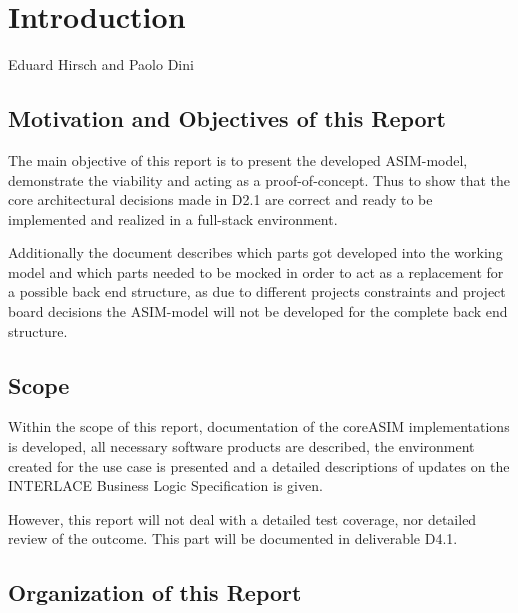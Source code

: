 \chapter{Introduction}
\label{ch:Introduction}

\vspace{-1cm}
\begin{center}
Eduard Hirsch and Paolo Dini
\end{center}


\section{Motivation and Objectives of this Report}

The main objective of this report is to present the developed ASIM-model, demonstrate the viability and acting as a proof-of-concept. Thus to show that the core architectural decisions made in D2.1 are correct and ready to be implemented and realized in a full-stack environment.

Additionally the document describes which parts got developed into the working model and which parts needed to be mocked in order to act as a replacement for a possible back end structure, as due to different projects constraints and project board decisions the ASIM-model will not be developed for the complete back end structure.

\section{Scope}

Within the scope of this report, documentation of the coreASIM implementations is developed, all necessary software products are described, the environment created for the use case is presented and a detailed descriptions of updates on the
INTERLACE Business Logic Specification is given. 

However, this report will not deal with a detailed test coverage, nor detailed review of the outcome. This part will be documented in deliverable D4.1.

\section{Organization of this Report}


\newpage
